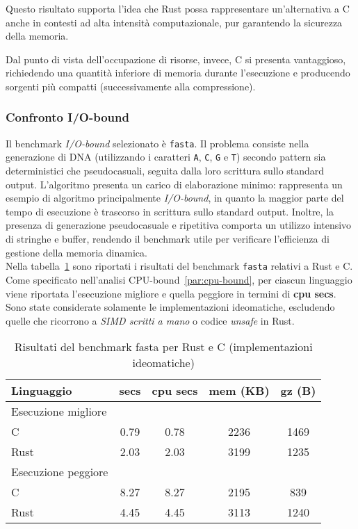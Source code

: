 Questo risultato supporta l'idea che Rust possa rappresentare un'alternativa a C anche in contesti ad alta intensità computazionale, pur garantendo la sicurezza della memoria.

Dal punto di vista dell'occupazione di risorse, invece, C si presenta vantaggioso, richiedendo una quantità inferiore di memoria durante l'esecuzione e producendo sorgenti più compatti (successivamente alla compressione).

\subsubsection{Confronto I/O-bound} Il benchmark \textit{I/O-bound} selezionato è \texttt{fasta}. Il problema consiste nella generazione di DNA (utilizzando i caratteri \texttt{A}, \texttt{C}, \texttt{G} e \texttt{T}) secondo pattern sia deterministici che pseudocasuali, seguita dalla 
loro scrittura sullo standard output. 
L'algoritmo presenta un carico di elaborazione minimo: rappresenta un esempio di algoritmo principalmente \textit{I/O-bound}, in quanto la maggior parte del tempo di esecuzione è trascorso in scrittura sullo standard output.
Inoltre, la presenza di generazione pseudocasuale e ripetitiva comporta un utilizzo intensivo di stringhe e buffer, rendendo il benchmark utile per verificare l'efficienza di gestione della memoria dinamica. \hfill
\vspace{7pt}\\
\noindent Nella tabella~\ref{tab:fasta} sono riportati i risultati del benchmark \texttt{fasta} relativi a Rust e C.
Come specificato nell'analisi CPU-bound~\ref{par:cpu-bound}, per ciascun linguaggio viene riportata l'esecuzione migliore e quella peggiore in termini di \textbf{cpu secs}. Sono state considerate solamente
le implementazioni ideomatiche, escludendo quelle che ricorrono a \textit{SIMD scritti a mano} o codice \textit{unsafe} in Rust.
\begin{table}[h]
    \centering
    \begin{tabular}{lcccc}
        \toprule
        \textbf{Linguaggio} & \textbf{secs} & \textbf{cpu secs} & \textbf{mem} (KB) & \textbf{gz} (B) \\
        \midrule
        Esecuzione migliore & & & & \\
        C & 0.79 & 0.78  & 2236 & 1469\\
        Rust & 2.03 & 2.03 & 3199 & 1235 \\
        \midrule
        Esecuzione peggiore & & & & \\
        C & 8.27 & 8.27 & 2195 & 839 \\
        Rust & 4.45 & 4.45 & 3113 & 1240 \\
        \bottomrule
    \end{tabular}
    \caption{Risultati del benchmark fasta per Rust e C (implementazioni ideomatiche)}\label{tab:fasta}
\end{table}
